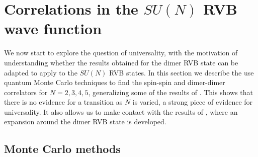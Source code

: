 \documentclass[11pt]{iopart}
\begin{document}
\section{Correlations in the $SU(N)$ RVB wave function}
\label{sec:correlations}
We now start to explore the question of universality, with the motivation of understanding whether the results obtained for the dimer RVB state can be adapted to apply to the $SU(N)$ RVB states. In this section we describe the use quantum Monte Carlo techniques to find the spin-spin and dimer-dimer correlators for $N=2,3,4,5$, generalizing some of the results of \cite{RVB1,RVB2}. This shows that there is no evidence for a transition as $N$ is varied, a strong piece of evidence for universality. It also allows us to make contact with the results of \cite{Damle}, where an expansion around the dimer RVB state is developed.


\subsection{Monte Carlo methods}
\label{sec:numerics}
\end{document}
